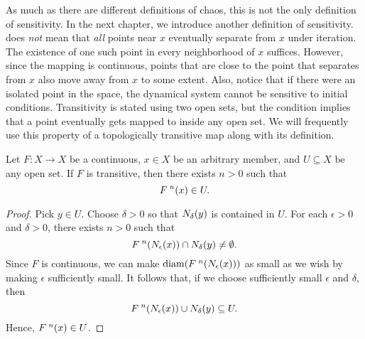 \documentclass[10pt,draft,twoside]{book}
\begin{document}
As much as there are different definitions of chaos, this is not the only definition of sensitivity.
In the next chapter, we introduce another definition of sensitivity.
\sdic does \textit{not} mean that \textit{all} points near $x$ eventually separate from $x$ under iteration.
The existence of one such point in every neighborhood of $x$ suffices.
However, since the mapping is continuous, points that are close to the point that separates from $x$ also move away from $x$ to some extent.
Also, notice that if there were an isolated point in the space, the dynamical system cannot be sensitive to initial conditions.
Transitivity is stated using two open sets, but the condition implies that a point eventually gets mapped to inside any open set.
We will frequently use this property of a topologically transitive map along with its definition.
\begin{proposition}
  Let $F: X \to X$ be a continuous, $x \in X$ be an arbitrary member, and $U \subseteq X$ be any open set.
  If $F$ is transitive, then there exists $n > 0$ such that
  \begin{equation*}
    F^{\;n}(x) \in U.
  \end{equation*}
  \begin{proof}
    Pick $y \in U$.
    Choose $\delta > 0$ so that $N_{\delta}(y)$ is contained in $U$.
    For each $\epsilon > 0$ and $\delta > 0$, there exists $n > 0$ such that
    \begin{equation*}
      F^{\;n}(N_{\epsilon}(x)) \cap N_{\delta}(y) \neq \emptyset.
    \end{equation*}
    Since $F$ is continuous, we can make $\mathrm{diam}(F^{\;n}(N_{\epsilon}(x)))$ as small as we wish by making $\epsilon$ sufficiently small.
    It follows that, if we choose sufficiently small $\epsilon$ and $\delta$, then 
    \begin{equation*}
      F^{\;n}(N_{\epsilon}(x)) \cup N_{\delta}(y) \subseteq U.
    \end{equation*}
    Hence, $F^{\;n}(x) \in U$.
  \end{proof}
\end{proposition}
\end{document}
